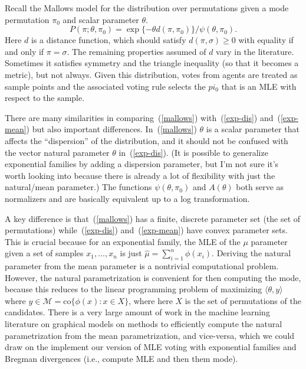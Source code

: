 \documentclass[10pt,letterpaper]{article}
\newcommand{\mM}{\ensuremath{\mathcal{M}}}
\newcommand{\ip}[2]{\ensuremath{\langle #1, #2 \rangle}}
\newcommand{\co}{\mbox{co}}
\begin{document}
Recall the Mallows model for the distribution over permutations given a mode permutation $\pi_0$ and scalar parameter $\theta$.
%
\begin{equation} \label{mallows}
P(\pi ; \theta, \pi_0) = \exp\{ -\theta d(\pi,\pi_0) \} / \psi(\theta, \pi_0).
\end{equation}
%
Here $d$ is a distance function, which should satisfy $d(\pi, \sigma) \geq 0$ with equality if and only if $\pi = \sigma$. The remaining properties assumed of $d$ vary in the literature. Sometimes it satisfies symmetry and the triangle inequality (so that it becomes a metric), but not always. Given this distribution, votes from agents are treated as sample points and the associated voting rule selects the $pi_0$ that is an MLE with respect to the sample.

There are many similarities in comparing~(\ref{mallows}) with~(\ref{exp-dis}) and~(\ref{exp-mean}) but also important differences. In~(\ref{mallows}) $\theta$ is a scalar parameter that affects the ``dispersion'' of the distribution, and it should not be confused with the vector natural parameter $\theta$ in~(\ref{exp-dis}). (It is possible to generalize exponential families by adding a dispersion parameter, but I'm not sure it's worth looking into because there is already a lot of flexibility with just the natural/mean parameter.) The functions $\psi(\theta, \pi_0)$ and $A(\theta)$ both serve as normalizers and are basically equivalent up to a log transformation.

A key difference is that~(\ref{mallows}) has a finite, discrete parameter set (the set of permutations) while~(\ref{exp-dis}) and~(\ref{exp-mean}) have convex parameter sets. This is crucial because for an exponential family, the MLE of the $\mu$ parameter given a set of samples $x_1,\ldots,x_n$ is just $\hat{\mu} = \sum_{i=1}^n \phi(x_i)$. Deriving the natural parameter from the mean parameter is a nontrivial computational problem. However, the natural parametrization is convenient for then computing the mode, because this reduces to the linear programming problem of maximizing $\ip{\theta}{y}$ where $y \in \mM = \co\{ \phi(x) : x \in X \}$, where here $X$ is the set of permutations of the candidates. There is a very large amount of work in the machine learning literature on graphical models on methods to efficiently compute the natural parametrization from the mean parametrization, and vice-versa, which we could draw on the implement our version of MLE voting with exponential families and Bregman divergences (i.e., compute MLE and then them mode).
\end{document}
